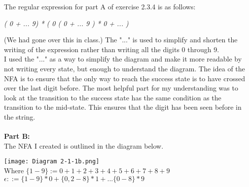 \documentclass{article}
\theoremstyle{theorem}
\theoremstyle{definition}
\theoremstyle{remark}
\begin{document}
The regular expression for part A of exercise 2.3.4 is as follows:
\begin{center}
    \textit{( 0 + ... 9) * ( 0 ( 0 + ... 9 ) * 0 + ... )}
\end{center}
(We had gone over this in class.) The "..." is used to simplify and shorten the writing of the expression rather than writing all the digits 0 through 9.
\\
I used the "..." as a way to simplify the diagram and make it more readable by not writing every state, but enough to understand the diagram. 
The idea of the NFA is to ensure that the only way to reach the success state is to have crossed over the last digit before. 
The most helpful part for my understanding was to look at the transition to the success state has the same condition as the transition to the mid-state. 
This ensures that the digit has been seen before in the string.\\
\\
\textbf{Part B:}\\
The NFA I created is outlined in the diagram below.
\begin{center}
    \texttt{[image: Diagram 2-1-1b.png]}\\
    Where $\{1-9\}:= 0+1+2+3+4+5+6+7+8+9$ \\
    $\epsilon ::= \{1-9\}*0 + \{0,2-8\}*1+...\{0-8\}*9$
\end{center}
\end{document}
